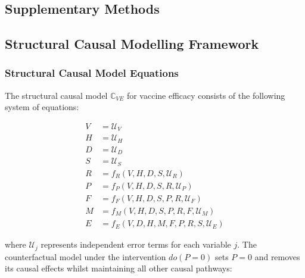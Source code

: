 \documentclass[a4paper, hidelinks, 11pt]{article}
\begin{document}
\begin{appendices}

	\section{Supplementary Methods}\label{supdata:Methods}

	\subsection{Structural Causal Modelling Framework}\label{supdata:SCMframework}

	\subsubsection{Structural Causal Model Equations}\label{supdata:SCMequations}

	The structural causal model $\mathbb{C}_{VE}$ for vaccine efficacy consists of the following system of equations:

	\begin{align}
		V & = \mathcal{U}_V                                             \\
		H & = \mathcal{U}_H                                             \\
		D & = \mathcal{U}_D                                             \\
		S & = \mathcal{U}_S                                             \\
		R & = f_R(V, H, D, S, \mathcal{U}_R)                            \\
		P & = f_P(V, H, D, S, R, \mathcal{U}_P)                         \\
		F & = f_F(V, H, D, S, P, R, \mathcal{U}_F)                      \\
		M & = f_M(V, H, D, S, P, R, F, \mathcal{U}_M)                   \\
		E & = f_E(V, D, H, M, F, P, R, S, \mathcal{U}_E) \label{eq:SCM}
	\end{align}

	where $\mathcal{U}_j$ represents independent error terms for each variable $j$. The counterfactual model under the intervention $do(P=0)$ sets $P=0$ and removes its causal effects whilst maintaining all other causal pathways:


\end{appendices}
\end{document}
